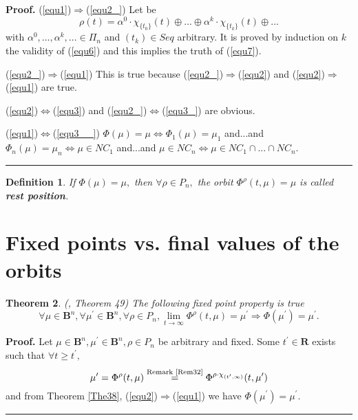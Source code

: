 \documentclass[12pt]{article}\usepackage{amsmath}
\newtheorem{theorem}{Theorem}
\newtheorem{definition}[theorem]{Definition}
\newenvironment{proof}[1][Proof]{\textbf{#1.} }{\ \rule{0.5em}{0.5em}}
\begin{document}
\begin{proof}
(\ref{equ1})$\Longrightarrow$(\ref{equ2_}) Let be\begin{equation}
\rho(t)=\alpha^{0}\cdot\chi_{\{t_{0}\}}(t)\oplus...\oplus\alpha^{k}\cdot
\chi_{\{t_{k}\}}(t)\oplus... \label{equ8}\end{equation}
with $\alpha^{0},...,\alpha^{k},...\in\Pi_{n}$ and $(t_{k})\in Seq$ arbitrary.
It is proved by induction on $k$ the validity of (\ref{equ6}) and this implies
the truth of (\ref{equ7}).

(\ref{equ2_})$\Longrightarrow$(\ref{equ1}) This is true because (\ref{equ2_})$\Longrightarrow$(\ref{equ2}) and (\ref{equ2})$\Longrightarrow$(\ref{equ1})
are true.

(\ref{equ2})$\Longleftrightarrow$(\ref{equ3}) and (\ref{equ2_})$\Longleftrightarrow$(\ref{equ3_}) are obvious.

(\ref{equ1})$\Longleftrightarrow$(\ref{equ3__}) $\Phi(\mu)=\mu
\Longleftrightarrow\Phi_{1}(\mu)=\mu_{1}$ and...and $\Phi_{n}(\mu)=\mu
_{n}\Longleftrightarrow\mu\in NC_{1}$ and...and $\mu\in NC_{n}\Longleftrightarrow\mu\in NC_{1}\cap...\cap NC_{n}.$
\end{proof}

\begin{definition}
If $\Phi(\mu)=\mu,$ then $\forall\rho\in P_{n},$ the orbit $\Phi^{\rho}(t,\mu)=\mu$ is called \textbf{rest position}.
\end{definition}

\section{Fixed points vs. final values of the orbits}

\begin{theorem}
\label{The8}(\cite{bib7}, Theorem 49) The following fixed point property is
true\[
\forall\mu\in\mathbf{B}^{n},\forall\mu^{\prime}\in\mathbf{B}^{n},\forall
\rho\in P_{n},\underset{t\rightarrow\infty}{\lim}\Phi^{\rho}(t,\mu
)=\mu^{\prime}\Longrightarrow\Phi(\mu^{\prime})=\mu^{\prime}.
\]

\end{theorem}

\begin{proof}
Let $\mu\in\mathbf{B}^{n},\mu^{\prime}\in\mathbf{B}^{n},\rho\in P_{n}$ be
arbitrary and fixed. Some $t^{\prime}\in\mathbf{R}$ exists such that $\forall
t\geq t^{\prime},$\[
\mu^{\prime}=\Phi^{\rho}(t,\mu)\overset{\text{Remark \ref{Rem32}}}{=}\Phi^{\rho\cdot\chi_{(t^{\prime},\infty)}}(t,\mu^{\prime})
\]
and from Theorem \ref{The38}, (\ref{equ2})$\Longrightarrow$(\ref{equ1}) we
have $\Phi(\mu^{\prime})=\mu^{\prime}.$
\end{proof}
\end{document}
